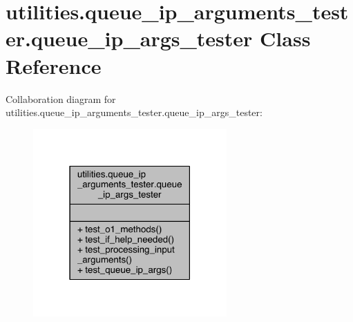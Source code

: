 \hypertarget{classutilities_1_1queue__ip__arguments__tester_1_1queue__ip__args__tester}{}\section{utilities.\+queue\+\_\+ip\+\_\+arguments\+\_\+tester.\+queue\+\_\+ip\+\_\+args\+\_\+tester Class Reference}
\label{classutilities_1_1queue__ip__arguments__tester_1_1queue__ip__args__tester}


Collaboration diagram for utilities.\+queue\+\_\+ip\+\_\+arguments\+\_\+tester.\+queue\+\_\+ip\+\_\+args\+\_\+tester\+:
\nopagebreak
\begin{figure}[H]
\begin{center}
\leavevmode
\includegraphics[width=210pt]{d0/dd1/classutilities_1_1queue__ip__arguments__tester_1_1queue__ip__args__tester__coll__graph}
\end{center}
\end{figure}
